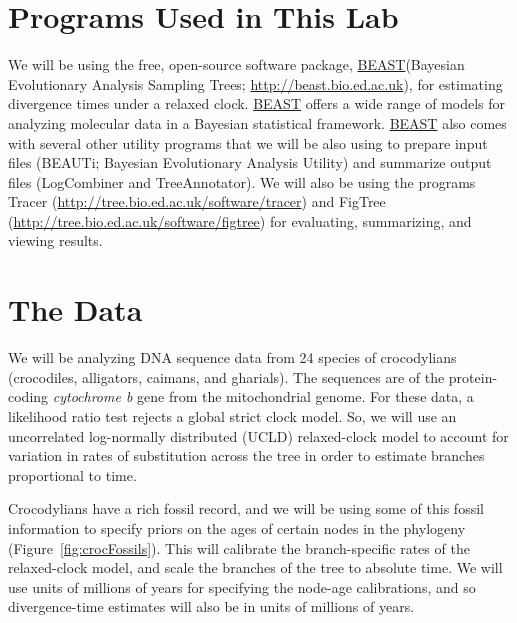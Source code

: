 \documentclass{article}
\newcommand{\program}[1]{#1\xspace}
\newcommand{\beast}{\href{http://beast.bio.ed.ac.uk/Main_Page}{\program{BEAST}}\xspace}
\begin{document}
\section{Programs Used in This Lab}
We will be using the free, open-source software package, \beast (Bayesian
Evolutionary Analysis Sampling Trees;
\href{http://beast.bio.ed.ac.uk}{\url{http://beast.bio.ed.ac.uk}}), for
estimating divergence times under a relaxed clock.
\beast offers a wide range of models for analyzing molecular data in
a Bayesian statistical framework.
\beast also comes with several other utility programs that we will be also
using to prepare input files (\program{BEAUTi}; Bayesian Evolutionary Analysis
Utility) and summarize output files (\program{LogCombiner and TreeAnnotator}).
We will also be using the programs \program{Tracer}
(\href{http://tree.bio.ed.ac.uk/software/tracer}{\url{http://tree.bio.ed.ac.uk/software/tracer}})
and \program{FigTree}
(\href{http://tree.bio.ed.ac.uk/software/figtree}{\url{http://tree.bio.ed.ac.uk/software/figtree}})
for evaluating, summarizing, and viewing results.

\section{The Data}
We will be analyzing DNA sequence data from 24 species of crocodylians
(crocodiles, alligators, caimans, and gharials).
The sequences are of the protein-coding \emph{cytochrome b} gene from the
mitochondrial genome.
For these data, a likelihood ratio test rejects a global strict clock model.
So, we will use an uncorrelated log-normally distributed (UCLD) relaxed-clock
model \citep{Drummond2006} to account for variation in rates of substitution
across the tree in order to estimate branches proportional to time.

Crocodylians have a rich fossil record, and we will be using some of this
fossil information to specify priors on the ages of certain nodes in the
phylogeny (Figure~\ref{fig:crocFossils}).
This will calibrate the branch-specific rates of the relaxed-clock model, and
scale the branches of the tree to absolute time.
We will use units of millions of years for specifying the node-age
calibrations, and so divergence-time estimates will also be in units of
millions of years.
\end{document}
